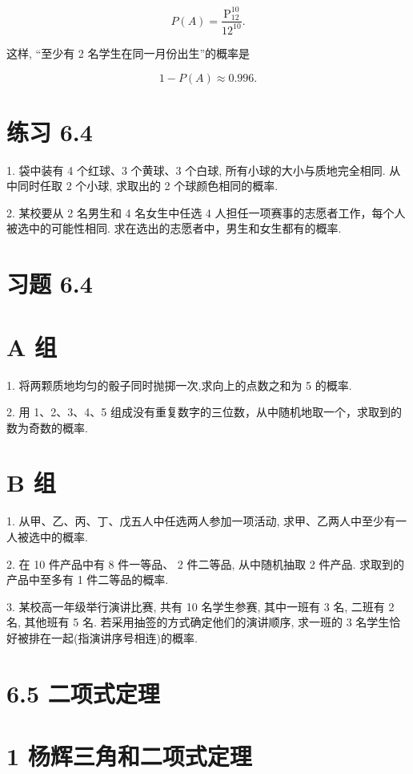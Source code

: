 \documentclass[10pt]{article}
\begin{document}
\[
P\left( A\right)  = \frac{{\mathrm{P}}_{12}^{10}}{{12}^{10}}.
\]

这样, “至少有 2 名学生在同一月份出生”的概率是

\[
1 - P\left( A\right)  \approx  {0.996}.
\]

\section*{练习 6.4}

1. 袋中装有 4 个红球、3 个黄球、3 个白球, 所有小球的大小与质地完全相同. 从中同时任取 2 个小球, 求取出的 2 个球颜色相同的概率.

2. 某校要从 2 名男生和 4 名女生中任选 4 人担任一项赛事的志愿者工作，每个人被选中的可能性相同. 求在选出的志愿者中，男生和女生都有的概率.

\section*{习题 6.4}

\section*{A 组}

1. 将两颗质地均匀的骰子同时抛掷一次,求向上的点数之和为 5 的概率.

2. 用 1、2、3、4、5 组成没有重复数字的三位数，从中随机地取一个，求取到的数为奇数的概率.

\section*{B 组}

1. 从甲、乙、丙、丁、戊五人中任选两人参加一项活动, 求甲、乙两人中至少有一人被选中的概率.

2. 在 10 件产品中有 8 件一等品、 2 件二等品, 从中随机抽取 2 件产品. 求取到的产品中至多有 1 件二等品的概率.

3. 某校高一年级举行演讲比赛, 共有 10 名学生参赛, 其中一班有 3 名, 二班有 2 名, 其他班有 5 名. 若采用抽签的方式确定他们的演讲顺序, 求一班的 3 名学生恰好被排在一起(指演讲序号相连)的概率.

\section*{6.5 二项式定理}

\section*{1 杨辉三角和二项式定理}
\end{document}
